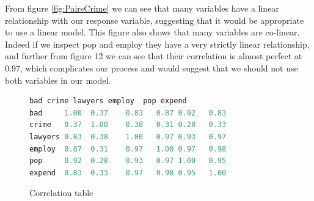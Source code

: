 \documentclass{article}
\begin{document}
    From figure \ref{fig:PairsCrime} we can see that many variables have a linear relationship with our response variable, suggesting that it would be appropriate to use a linear model. This figure also shows that many variables are co-linear. Indeed if we inspect pop and employ they have a very strictly linear relationship, and further from figure 12 we can see that their correlation is almost perfect at 0.97, which complicates our process and would suggest that we should not use both variables in our model. 
 
      	\begin{figure}[H]
	\begin{lstlisting}[language=R]
         bad crime lawyers employ  pop expend
bad     1.00  0.37    0.83   0.87 0.92   0.83
crime   0.37  1.00    0.38   0.31 0.28   0.33
lawyers 0.83  0.38    1.00   0.97 0.93   0.97
employ  0.87  0.31    0.97   1.00 0.97   0.98
pop     0.92  0.28    0.93   0.97 1.00   0.95
expend  0.83  0.33    0.97   0.98 0.95   1.00    
       \end{lstlisting}
    \caption{Correlation table}
    \label{table:cortble}
    \end{figure} 
    
\end{document}
